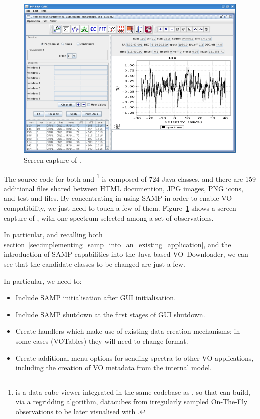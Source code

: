 		\begin{figure}[tbp]
			\centering
				\includegraphics[height=0.4\textheight]{fig/massa1.png}
			\caption[Screen capture of \massa{}]
			{Screen capture of \massa{}.}
			\label{fig:fig_massa1}
		\end{figure}
		
		
		The source code for both \massa{} and
		\madcuba{}\footnote{\madcuba{} is a data cube viewer
		integrated in the same codebase as \massa{}, so that
		\massa{} can build, via a regridding algorithm, datacubes
		from irregularly sampled On-The-Fly observations to be
		later visualised with \madcuba{}.} is composed of 724 Java
		classes, and there are 159 additional files shared between
		HTML documention, JPG images, PNG icons, and test
		 and  files. By concentrating in
		using SAMP in order to enable VO compatibility, we just
		need to touch a few of them. Figure~\ref{fig:fig_massa1}
		shows a screen capture of \massa{}, with one spectrum
		selected among a set of observations.
		
		In particular, and recalling both
	section~\ref{sec:implementing_samp_into_an_existing_application},
		and the introduction of SAMP capabilities into the
		Java-based VO~Downloader, we can see that the candidate
		classes to be changed are just a few.
		
		In particular, we need to:
		
		\begin{itemize}
			\item Include SAMP initialisation after GUI
			initialisation.
			
			\item Include SAMP shutdown at the first stages
			of GUI shutdown.
			
			\item Create  handlers which
			make use of existing data creation mechanisms;
			in some cases (VOTables) they will need to
			change format.
			
			\item Create additional menu options for
			sending \massa{} spectra to other VO applications,
			including the creation of VO metadata from the \massa{}
			internal model.
		\end{itemize}
		
